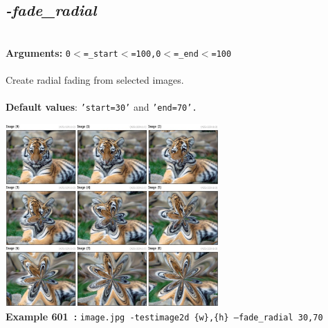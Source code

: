 \documentclass[a4paper,11pt,twoside]{book}
\begin{document}
\subsection{\emph{-fade\_radial} }\vspace*{-0.5em}
~\\\textbf{Arguments: } 
{\small \texttt{0$<$=\_start$<$=100,0$<$=\_end$<$=100}}\\~\\
Create radial fading from selected images.
~\\~\\\textbf{Default values}: {\small \texttt{'start=30'} and \texttt{'end=70'.}}
\begin{center}\includegraphics[keepaspectratio=true,height=7cm,width=\textwidth]{img/gmic_def601.jpg}\\
{\footnotesize \textbf{Example 601~:} \texttt{image.jpg -testimage2d \{w\},\{h\} --fade\_radial 30,70}}
\end{center}
\end{document}
